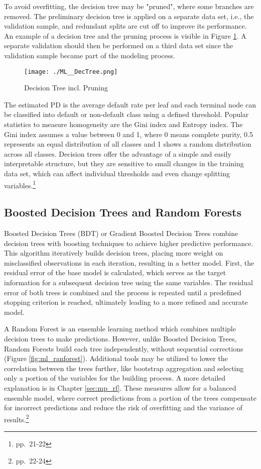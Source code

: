 To avoid overfitting, the decision tree may be "pruned", where some branches are removed. The preliminary decision tree is applied on a separate data set, i.e., the validation sample, and redundant splits are cut off to improve its performance. An example of a decision tree and the pruning process is visible in Figure \ref{fig:ml_dectree}. A separate validation should then be performed on a third data set since the validation sample became part of the modeling process. 

\begin{figure}[H]
	\centering
	\texttt{[image: ./ML\_\_DecTree.png]}
    \caption{Decision Tree incl. Pruning}
    \label{fig:ml_dectree}
\end{figure}

The estimated PD is the average default rate per leaf and each terminal node can be classified into default or non-default class using a defined threshold. Popular statistics to measure homogeneity are the Gini index and Entropy index. The Gini index assumes a value between 0 and 1, where 0 means complete purity, 0.5 represents an equal distribution of all classes and 1 shows a random distribution across all classes. Decision trees offer the advantage of a simple and easily interpretable structure, but they are sensitive to small changes in the training data set, which can affect individual thresholds and even change splitting variables.\footnote{\cite{locatelli:2022} pp.~21-22}

\subsection{Boosted Decision Trees and Random Forests} 
Boosted Decision Trees (BDT) or Gradient Boosted Decision Trees combine decision trees with boosting techniques to achieve higher predictive performance. This algorithm iteratively builds decision trees, placing more weight on misclassified observations in each iteration, resulting in a better model. First, the residual error of the base model is calculated, which serves as the target information for a subsequent decision tree using the same variables. The residual error of both trees is combined and the process is repeated until a predefined stopping criterion is reached, ultimately leading to a more refined and accurate model.

A Random Forest is an ensemble learning method which combines multiple decision trees to make predictions. However, unlike Boosted Decision Trees, Random Forests build each tree independently, without sequential corrections (Figure \ref{fig:ml_ranforest}). Additional tools may be utilized to lower the correlation between the trees further, like bootstrap aggregation and selecting only a portion of the variables for the building process. A more detailed explanation is in Chapter \ref{sec:mp_rf}. These measures allow for a balanced ensemble model, where correct predictions from a portion of the trees compensate for incorrect predictions and reduce the risk of overfitting and the variance of results.\footnote{\cite{locatelli:2022} pp.~22-24}

